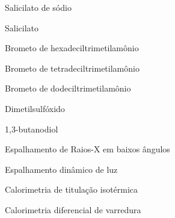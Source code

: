 \documentclass[
	12pt,				%
	openright,			%
	twoside,			%
	a4paper,			%
	english,			%
	brazil%
	]{abntex2}
\newcommand{\Sal}{Sal\textsuperscript{--}}
\newcommand{\CTAB}{C\textsubscript{16}TAB}
\newcommand{\TTAB}{C\textsubscript{14}TAB}
\newcommand{\DTAB}{C\textsubscript{12}TAB}
\newcommand{\BD}{1,3-BD}
\begin{document}

\listoffigures*
\cleardoublepage

\listoftables*
\listoflistings
\cleardoublepage

\begin{siglas}
  \item[NaSal] Salicilato de sódio
  \item[\Sal] Salicilato
  \item[\CTAB] Brometo de hexadeciltrimetilamônio
  \item[\TTAB] Brometo de tetradeciltrimetilamônio
  \item[\DTAB] Brometo de dodeciltrimetilamônio
  \item[DMSO] Dimetilsulfóxido
  \item[\BD] 1,3-butanodiol
  \item[SAXS] Espalhamento de Raios-X em baixos ângulos
  \item[DLS] Espalhamento dinâmico de luz
  \item[ITC] Calorimetria de titulação isotérmica
  \item[DSC] Calorimetria diferencial de varredura
\end{siglas}


\tableofcontents*
\cleardoublepage


\textual

\end{document}
